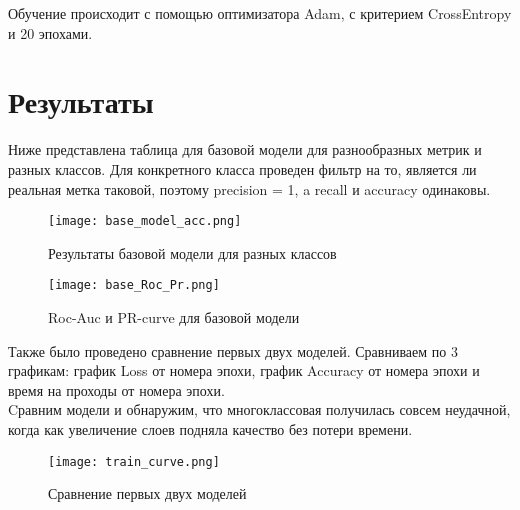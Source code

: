 \documentclass{article}
\begin{document}
Обучение происходит с помощью оптимизатора Adam, с критерием CrossEntropy и 20 эпохами. 

\section{Результаты}

Ниже представлена таблица для базовой модели для разнообразных метрик и разных классов. Для конкретного класса проведен фильтр на то, является ли реальная метка таковой, поэтому precision = 1, a recall и accuracy одинаковы. \\
\begin{figure}[ht]
    \centering
    \texttt{[image: base\_model\_acc.png]}
    \caption{Результаты базовой модели для разных классов}
    \label{fig:example}
\end{figure}
\begin{figure}[ht]
    \centering
    \texttt{[image: base\_Roc\_Pr.png]}
    \caption{Roc-Auc и PR-curve для базовой модели}
    \label{fig:example}
\end{figure}

Также было проведено сравнение первых двух моделей. Сравниваем по 3 графикам: график Loss от номера эпохи, график Accuracy от номера эпохи и время на проходы от номера эпохи. \\

Cравним модели и обнаружим, что многоклассовая получилась совсем неудачной, когда как увеличение слоев подняла качество без потери времени. \\





\begin{figure}[ht]
    \centering
    \texttt{[image: train\_curve.png]}
    \caption{Сравнение первых двух моделей}
    \label{fig:example}
\end{figure}




\end{document}
